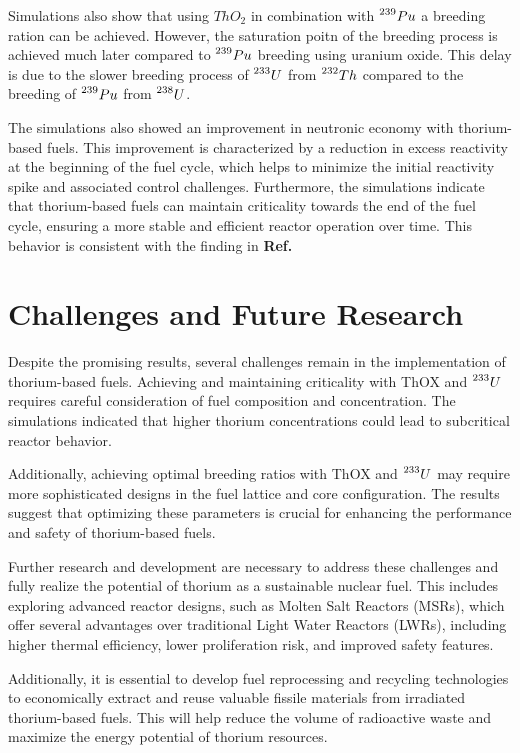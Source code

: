 Simulations also show that using \(ThO_2\) in combination with \(\prescript{239}{}{Pu}\) a breeding ration can be achieved. However, the saturation poitn of the breeding process is achieved much later compared to \(\prescript{239}{}{Pu}\) breeding using uranium oxide. This delay is due to the slower breeding process of \(\prescript{233}{}{U}\) from \(\prescript{232}{}{Th}\) compared to the breeding of \(\prescript{239}{}{Pu}\) from \(\prescript{238}{}{U}\).

The simulations also showed an improvement in neutronic economy with thorium-based fuels. This improvement is characterized by a reduction in excess reactivity at the beginning of the fuel cycle, which helps to minimize the initial reactivity spike and associated control challenges. Furthermore, the simulations indicate that thorium-based fuels can maintain criticality towards the end of the fuel cycle, ensuring a more stable and efficient reactor operation over time. This behavior is consistent with the finding in \textbf{Ref.}\cite{LAU201248}

\section{Challenges and Future Research}

Despite the promising results, several challenges remain in the implementation of thorium-based fuels. Achieving and maintaining criticality with ThOX and \(\prescript{233}{}{U}\) requires careful consideration of fuel composition and concentration. The simulations indicated that higher thorium concentrations could lead to subcritical reactor behavior.

Additionally, achieving optimal breeding ratios with ThOX and \(\prescript{233}{}{U}\) may require more sophisticated designs in the fuel lattice and core configuration. The results suggest that optimizing these parameters is crucial for enhancing the performance and safety of thorium-based fuels.

Further research and development are necessary to address these challenges and fully realize the potential of thorium as a sustainable nuclear fuel. This includes exploring advanced reactor designs, such as Molten Salt Reactors (MSRs), which offer several advantages over traditional Light Water Reactors (LWRs), including higher thermal efficiency, lower proliferation risk, and improved safety features.

Additionally, it is essential to develop fuel reprocessing and recycling technologies to economically extract and reuse valuable fissile materials from irradiated thorium-based fuels. This will help reduce the volume of radioactive waste and maximize the energy potential of thorium resources.

